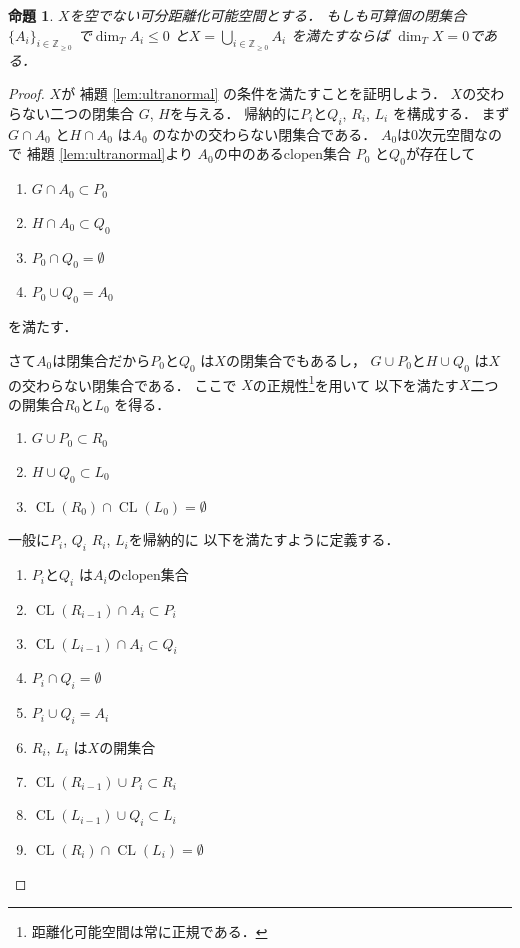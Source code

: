 \documentclass[leqno, a4paper, 12pt]{jsarticle}
\newtheorem{prop}[thm]{命題}
\newcommand{\zz}{\mathbb{Z}}
\DeclareMathOperator{\cl}{CL}
\numberwithin{equation}{section}
\begin{document}
\begin{prop}\label{prop:sumn=0}
$X$を空でない可分距離化可能空間とする．
もしも可算個の閉集合$\{A_{i}\}_{i\in \zz_{\ge 0}}$
で$\dim_{T}A_{i}\le 0$
と$X=\bigcup_{i\in \zz_{\ge 0}}A_{i}$
を満たすならば
$\dim_{T} X= 0$である．
\end{prop}
\begin{proof}
$X$が
補題 \ref{lem:ultranormal}
の条件を満たすことを証明しよう．
$X$の交わらない二つの閉集合
$G$, $H$を与える．
帰納的に$P_{i}$と$Q_{i}$, $R_{i}$, $L_{i}$
を構成する．
まず
$G\cap A_{0}$
と$H\cap A_{0}$
は$A_{0}$
のなかの交わらない閉集合である．
$A_{0}$は$0$次元空間なので
補題 \ref{lem:ultranormal}より
$A_{0}$の中のあるclopen集合
$P_{0}$
と$Q_{0}$が存在して
\begin{enumerate}
\item $G\cap A_{0}\subset P_{0}$
\item $H\cap A_{0}\subset Q_{0}$
\item $P_{0}\cap Q_{0}=\emptyset$
\item $P_{0}\cup Q_{0}=A_{0}$
\end{enumerate}
を満たす．

さて$A_{0}$は閉集合だから$P_{0}$と$Q_{0}$
は$X$の閉集合でもあるし，
$G\cup P_{0}$と$H\cup Q_{0}$
は$X$の交わらない閉集合である．
ここで
$X$の正規性\footnote{距離化可能空間は常に正規である．}を用いて
以下を満たす$X$二つの開集合$R_{0}$と$L_{0}$
を得る．
\begin{enumerate}
\item $G\cup P_{0}\subset R_{0}$
\item $H\cup Q_{0}\subset L_{0}$
\item $\cl (R_{0})\cap \cl(L_{0})=\emptyset$
\end{enumerate}

一般に$P_{i}$, $Q_{i}$
$R_{i}$, $L_{i}$を帰納的に
以下を満たすように定義する．
\begin{enumerate}
\item $P_{i}$と$Q_{i}$
は$A_{i}$のclopen集合
\item 
$\cl(R_{i-1})\cap A_{i}\subset P_{i}$
\item 
$\cl(L_{i-1})\cap A_{i}\subset Q_{i}$
\item 
$P_{i}\cap Q_{i}=\emptyset$
\item $P_{i}\cup Q_{i}=A_{i}$
\item $R_{i}$, $L_{i}$
は$X$の開集合
\item 
$\cl(R_{i-1})\cup P_{i}\subset R_{i}$

\item 
$\cl(L_{i-1})\cup Q_{i}\subset L_{i}$
\item 
$\cl(R_{i})\cap \cl(L_{i})=\emptyset$


\end{enumerate}
\end{proof}
\end{document}
